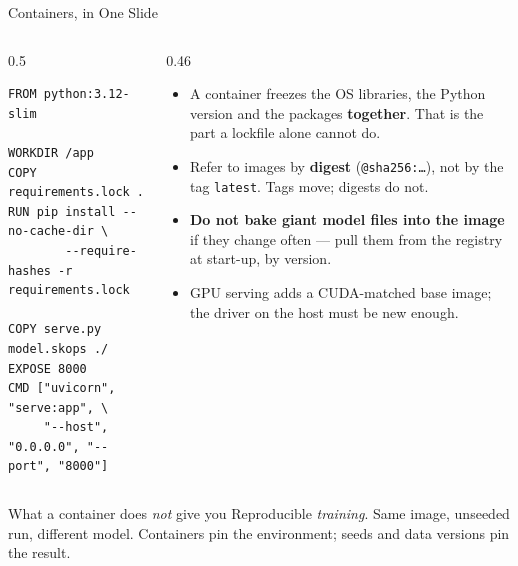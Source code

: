 \begin{frame}[fragile]{Containers, in One Slide}

    \begin{columns}[T]
        \begin{column}{0.5\textwidth}
            \begin{lstlisting}[basicstyle=\ttfamily\scriptsize]
FROM python:3.12-slim

WORKDIR /app
COPY requirements.lock .
RUN pip install --no-cache-dir \
        --require-hashes -r requirements.lock

COPY serve.py model.skops ./
EXPOSE 8000
CMD ["uvicorn", "serve:app", \
     "--host", "0.0.0.0", "--port", "8000"]
            \end{lstlisting}
        \end{column}
        \begin{column}{0.46\textwidth}
            \small
            \begin{itemize}
                \setlength\itemsep{0.4em}
                \item A container freezes the OS libraries, the Python version and the packages
                      \textbf{together}. That is the part a lockfile alone cannot do.
                \item Refer to images by \textbf{digest} (\texttt{@sha256:\ldots}), not by the tag
                      \texttt{latest}. Tags move; digests do not.
                \item \textbf{Do not bake giant model files into the image} if they change often --- pull them
                      from the registry at start-up, by version.
                \item GPU serving adds a CUDA-matched base image; the driver on the host must be new enough.
            \end{itemize}
        \end{column}
    \end{columns}

    \vspace{0.6em}
    \begin{block}{What a container does \emph{not} give you}
        Reproducible \emph{training}. Same image, unseeded run, different model. Containers pin the
        environment; seeds and data versions pin the result.
    \end{block}

\end{frame}

